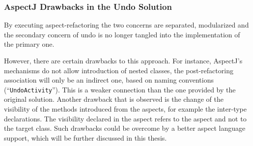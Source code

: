 \subsubsection{AspectJ Drawbacks in the Undo Solution}
By executing aspect-refactoring the two concerns are separated, modularized and the secondary concern of undo is no longer tangled into the implementation of the primary one.

However, there are certain drawbacks to this approach.
For instance, AspectJ's mechanisms do not allow introduction of nested classes, the post-refactoring association will only be an indirect one, based on naming conventions (``\texttt{UndoActivity}''). 
This is a weaker connection than the one provided by the original solution. 
Another drawback that is observed is the change of the visibility of the methods introduced from the aspects, for example the inter-type declarations. 
The visibility declared in the aspect refers to the aspect and not to the target class. 
Such drawbacks could be overcome by a better aspect language support, which will be further discussed in this thesis.


